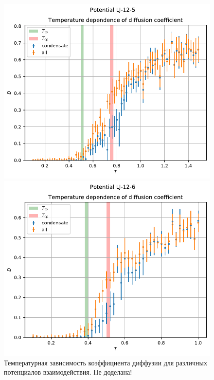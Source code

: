 \documentclass[pdf,hyperref={unicode}]{beamer}
\begin{document}
\begin{frame}
\begin{figure}[h]
\begin{center}
\begin{minipage}[h]{0.35\linewidth}
\end{minipage}
\begin{minipage}[h]{0.35\linewidth}
\includegraphics[width=\textwidth, keepaspectratio]{plot_diffusion_Potential LJ-12-5_1}
\end{minipage}
\begin{minipage}[h]{0.35\linewidth}
\includegraphics[width=\textwidth, keepaspectratio]{plot_diffusion_Potential LJ-12-6_1}
\end{minipage}
\caption{\tiny Температурная зависимость коэффициента диффузии для различных потенциалов взаимодействия. Не доделана!}
\label{risD}
\end{center}
\end{figure}

\end{frame}
\end{document}
